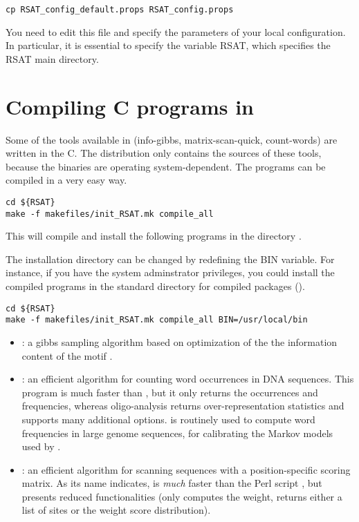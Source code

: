 \documentclass[12pt,a4paper, oneside]{scrreprt} %
\begin{document}
\begin{lstlisting}
cp RSAT_config_default.props RSAT_config.props
\end{lstlisting}


You need to edit this file and specify the parameters of your local
configuration. In particular, it is essential to specify the variable
RSAT, which specifies the RSAT main directory.

\section{Compiling C programs in \RSAT}

Some of the tools available in \RSAT (info-gibbs, matrix-scan-quick,
count-words) are written in the C. The distribution only contains
the sources of these tools, because the binaries are operating
system-dependent. The programs can be compiled in a very easy way.

\begin{lstlisting}
cd ${RSAT}
make -f makefiles/init_RSAT.mk compile_all
\end{lstlisting}

This will compile and install the following programs in the directory
. 

The installation directory can be changed by redefining the BIN
variable. For instance, if you have the system adminstrator
privileges, you could install the compiled programs in the standard
directory for compiled packages ().

\begin{lstlisting}
cd ${RSAT}
make -f makefiles/init_RSAT.mk compile_all BIN=/usr/local/bin
\end{lstlisting}


\begin{itemize}
\item {}: a gibbs sampling algorithm based on
  optimization of the the information content of the motif
  \cite{Defrance:2009}.

\item {}: an efficient algorithm for counting word
  occurrences in DNA sequences. This program is much faster than
  , but it only returns the occurrences and
  frequencies, whereas oligo-analysis returns over-representation
  statistics and supports many additional
  options.  is routinely used to compute word
  frequencies in large genome sequences, for calibrating the Markov
  models used by .

\item {}: an efficient algorithm for scanning
  sequences with a position-specific scoring matrix. As its name
  indicates,  is \emph{much} faster than
  the Perl script , but presents reduced
  functionalities (only computes the weight, returns either a list of
  sites or the weight score distribution).
\end{itemize}
\end{document}
